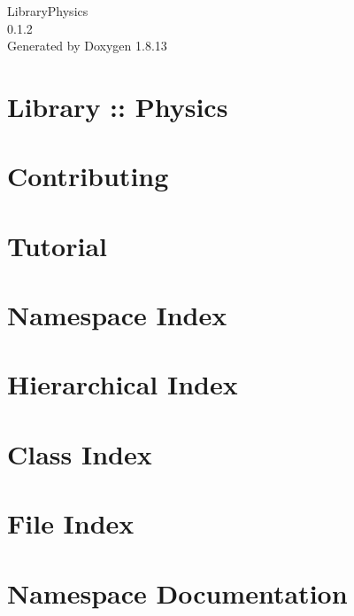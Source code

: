 \documentclass[twoside]{book}
\newcommand{\+}{\discretionary{\mbox{\scriptsize$\hookleftarrow$}}{}{}}
\newcommand{\clearemptydoublepage}{%
  \newpage{\pagestyle{empty}\cleardoublepage}%
}
\begin{document}
\hypersetup{pageanchor=false,
             bookmarksnumbered=true,
             pdfencoding=unicode
            }
\begin{titlepage}
\vspace*{7cm}
\begin{center}%
{\Large Library\+Physics \\[1ex]\large 0.\+1.\+2 }\\
\vspace*{1cm}
{\large Generated by Doxygen 1.8.13}\\
\end{center}
\end{titlepage}
\clearemptydoublepage
{}
\tableofcontents
\clearemptydoublepage
{}
\hypersetup{pageanchor=true}

\chapter{Library \+:\+: Physics}
\label{index}\hypertarget{index}{}
\chapter{Contributing}
\label{md__c_o_n_t_r_i_b_u_t_i_n_g}

\chapter{Tutorial}
\label{md_docs__tutorial}

\chapter{Namespace Index}

\chapter{Hierarchical Index}

\chapter{Class Index}

\chapter{File Index}

\chapter{Namespace Documentation}












\end{document}
